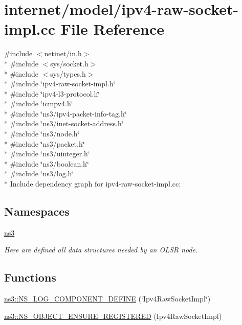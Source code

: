 \hypertarget{ipv4-raw-socket-impl_8cc}{}\section{internet/model/ipv4-\/raw-\/socket-\/impl.cc File Reference}
\label{ipv4-raw-socket-impl_8cc}
{\ttfamily \#include $<$netinet/in.\+h$>$}\\*
{\ttfamily \#include $<$sys/socket.\+h$>$}\\*
{\ttfamily \#include $<$sys/types.\+h$>$}\\*
{\ttfamily \#include \char`\"{}ipv4-\/raw-\/socket-\/impl.\+h\char`\"{}}\\*
{\ttfamily \#include \char`\"{}ipv4-\/l3-\/protocol.\+h\char`\"{}}\\*
{\ttfamily \#include \char`\"{}icmpv4.\+h\char`\"{}}\\*
{\ttfamily \#include \char`\"{}ns3/ipv4-\/packet-\/info-\/tag.\+h\char`\"{}}\\*
{\ttfamily \#include \char`\"{}ns3/inet-\/socket-\/address.\+h\char`\"{}}\\*
{\ttfamily \#include \char`\"{}ns3/node.\+h\char`\"{}}\\*
{\ttfamily \#include \char`\"{}ns3/packet.\+h\char`\"{}}\\*
{\ttfamily \#include \char`\"{}ns3/uinteger.\+h\char`\"{}}\\*
{\ttfamily \#include \char`\"{}ns3/boolean.\+h\char`\"{}}\\*
{\ttfamily \#include \char`\"{}ns3/log.\+h\char`\"{}}\\*
Include dependency graph for ipv4-\/raw-\/socket-\/impl.cc\+:
\subsection*{Namespaces}
\begin{DoxyCompactItemize}
\item 
 \hyperlink{namespacens3}{ns3}
\begin{DoxyCompactList}\small\item\em Here are defined all data structures needed by an O\+L\+SR node. \end{DoxyCompactList}\end{DoxyCompactItemize}
\subsection*{Functions}
\begin{DoxyCompactItemize}
\item 
\hyperlink{namespacens3_abb482a6e03f25c2d935c93bc0b76ae0f}{ns3\+::\+N\+S\+\_\+\+L\+O\+G\+\_\+\+C\+O\+M\+P\+O\+N\+E\+N\+T\+\_\+\+D\+E\+F\+I\+NE} (\char`\"{}Ipv4\+Raw\+Socket\+Impl\char`\"{})
\item 
\hyperlink{namespacens3_afe9e68b005501cf58d39064b594bf8fb}{ns3\+::\+N\+S\+\_\+\+O\+B\+J\+E\+C\+T\+\_\+\+E\+N\+S\+U\+R\+E\+\_\+\+R\+E\+G\+I\+S\+T\+E\+R\+ED} (Ipv4\+Raw\+Socket\+Impl)
\end{DoxyCompactItemize}
